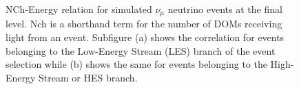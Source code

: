 \documentclass{gatech-thesis}
\begin{document}
\begin{figure}[0.05]\label{fig:FL_nch_by_energy}
\centering
{}
\caption{NCh-Energy relation for simulated $\nu_\mu$ neutrino events at the final level. Nch is a shorthand term for the number of DOMs receiving light from an event. Subfigure (a) shows the correlation for events belonging to the Low-Energy Stream (LES) branch of the event selection while (b) shows the same for events belonging to the High-Energy Stream or HES branch.} 
\end{figure}
\end{document}
